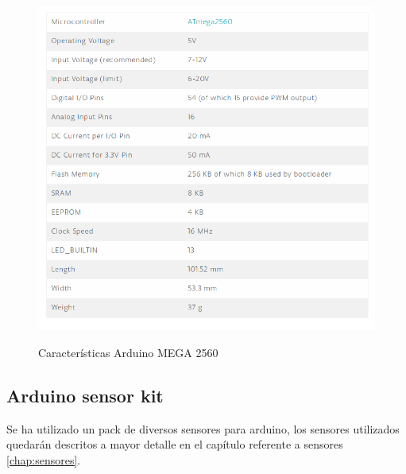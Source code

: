 \begin{figure}[H]
  \begin{center}
    \includegraphics[scale=0.5]{imagenes/arduino_caracteristicas.png}\\
    \caption{Características Arduino MEGA 2560}
  \end{center}
\end{figure}


\subsection {Arduino sensor kit}

Se ha utilizado un pack de diversos sensores para arduino, los sensores utilizados quedarán descritos a mayor detalle en el capítulo referente a sensores \ref{chap:sensores}.

